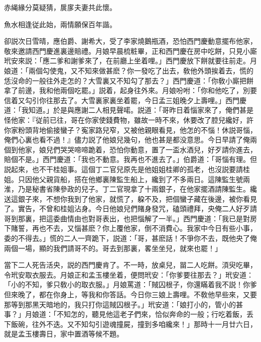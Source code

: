 \begin{myquote}
赤䋲緣分莫疑猜，扊扅夫妻共此懷。

魚水相逢従此始，兩情願保百年諧。
\end{myquote}

卻説次日雪晴，應伯爵、謝希大，受了李家燒鵝瓶酒，恐怕西門慶動意擺布他家，敬來邀請西門慶進裏邊賠禮。月娘早晨梳粧畢，正和西門慶在房中吃餅，只見小廝玳安來説：「應二爹和謝爹來了，在前廳上坐着哩。」西門慶放下餅就要往前走。月娘道：「兩個勾使鬼，又不知來做甚麽？你一發吃了出去，敎他外頭挨着去，慌的恁沒命的一般往外走怎的？大雪裏又不知勾了那去？」西門慶道：「你敎小廝把餅拿了前邊，我和他兩個吃罷。」説着，起身往外來。月娘吩咐：「你和他吃了，別要信着又勾引你往那去了。大雪裏家裏坐着罷，今日孟三姐晚夕上壽哩。」西門慶道：「我知道。」於是與應謝二人相見聲喏。説道：「哥昨日着惱家來了，俺們甚是怪他家：『従前已往，哥在你家使錢費物，雖故一時不來，休要改了腔兒纔好，許你家粉頭背地偷接蠻子？寃家路兒窄，又被他親眼看見，他怎的不惱！休説哥惱，俺們心裏也看不過！』儘力説了他娘兒幾句，他也甚是都没意思。今日早請了俺兩個到他家，娘兒們哭哭啼啼跪着，恐怕你動意，置了一盃水酒兒，好歹請你進去，賠個不是。」西門慶道：「我也不動意。我再也不進去了。」伯爵道：「哥惱有理。但説起來，也不干桂姐事。這個丁二官兒原先是他姐姐桂卿的孤老，也沒説要請桂姐。只因他父親貨船，搭在他鄉裏陳監生船上，纔到了不多兩日。這陳監生號兩淮，乃是秘書省陳參政的兒子。丁二官現拿了十兩銀子，在他家擺酒請陳監生。纔送這銀子來，不想你我到了他家，就慌了，躱不及，把個蠻子藏在後邊，被你看見了。實告，不曾和桂姐沾身。今日他娘兒們賭身發咒，磕頭禮拜，央俺二人好歹請哥到那裏，把這委曲情由也對哥表出，也把惱解了一半。」西門慶道：「我已是對房下賭誓，再也不去，又惱甚麽？你上覆他家，倒不消費心。我家中今日有些小事，委的不得去。」慌的二人一齊跪下，説道：「哥，甚麽話！不爭你不去，既他央了俺兩個一場，顯的我們請哥不的。哥去到那裏，畧坐坐兒，就來也罷！」

當下二人死告活央，説的西門慶肯了。不一時，放桌兒，㽞二人吃餅。湏臾吃畢，令玳安取衣服去。月娘正和孟玉樓坐着，便問玳安：「你爹要往那去？」玳安道：「小的不知，爹只敎小的取衣服。」月娘罵道：「賊囚根子，你還瞞着我不説！你爹但來晚了，都在你身上，等我和你答話。今日你三娘上壽哩。不敎他早些來，又要那等到那黑天暗地的，我只打你這賊囚根子。」玳安道：「娘打小的，管小的甚事？」月娘道：「不知怎的，聽見他這老子們來，恰似奔命的一般；行吃着飯，丢下飯碗，往外不迭。又不知勾引遊魂撞屍，撞到多咱纔來！」那時十一月廿六日，就是孟玉樓壽日，家中置酒等候不題。

